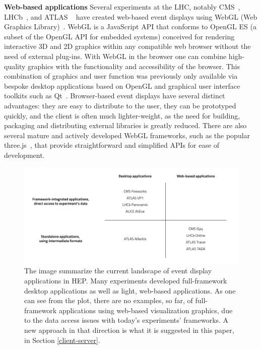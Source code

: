 \documentclass[12pt,a4paper]{article}
\begin{document}
{\bf Web-based applications} Several experiments at the LHC, notably CMS~\cite{CMSISpyWebGL}, LHCb~\cite{LHCbOnline2014}, and ATLAS
~\cite{ATLASTada2016, ATLASTracer2015} have created web-based event displays using WebGL (Web Graphics Library)~\cite{WebGL2011}.
WebGL is a JavaScript API that conforms to OpenGL ES (a subset of the OpenGL API for embedded systems) conceived for
rendering interactive 3D and 2D graphics within any compatible web browser without the need of external plug-ins.
With WebGL in the browser one can combine high-quality graphics with the functionality and accessibility of the browser.
This combination of graphics and user function was previously only available via bespoke desktop applications based on OpenGL and
graphical user interface toolkits such as Qt~\cite{QtFramework}. Browser-based event displays have several distinct advantages: they are
easy to distribute to the user, they can be prototyped quickly, and the client is often much lighter-weight,
as the need for building, packaging and distributing external libraries is greatly reduced.
There are also several mature and actively developed WebGL frameworks, such as the popular three.js~\cite{ThreeJS},
that provide straightforward and simplified APIs for ease of development.

\begin{figure}
	\centering
	\includegraphics[width=0.95\linewidth]{img/Current_Visualization_Landscape_v3}
	\caption[Current landscape of event display applications in HEP]{The image summarize the current landscape of event display applications in HEP.
	Many experiments developed full-framework desktop applications as well as light, web-based applications. As one can see from the plot,
	there are no examples, so far, of full-framework applications using web-based visualization graphics, due to the data access issues
	with today's experiments' frameworks. A new approach in that direction is what it is suggested in this paper, in Section \ref{client-server}.}
	\label{fig:currentvisualizationlandscape}
\end{figure}
\end{document}
